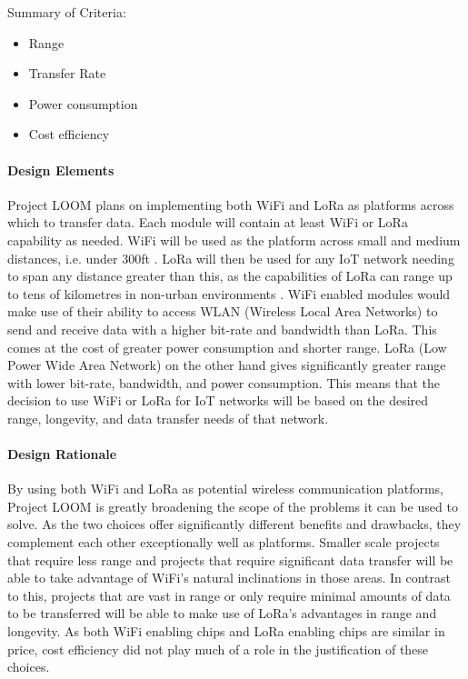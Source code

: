 \documentclass[onecolumn, draftclsnofoot,10pt, compsoc]{IEEEtran}
\begin{document}
    Summary of Criteria:
    \begin{itemize}[noitemsep,topsep=-10pt]
        \item Range
        \item Transfer Rate
        \item Power consumption
        \item Cost efficiency
    \end{itemize}

\paragraph{Design Elements}
    Project LOOM plans on implementing both WiFi and LoRa as platforms across which to transfer data. Each module will contain at least WiFi or LoRa capability as needed. WiFi will be used as the platform across small and medium distances, i.e. under 300ft \cite{WiFi}. LoRa will then be used for any IoT network needing to span any distance greater than this, as the capabilities of LoRa can range up to tens of kilometres in non-urban environments \cite{LoRa}. WiFi enabled modules would make use of their ability to access WLAN (Wireless Local Area Networks) to send and receive data with a higher bit-rate and bandwidth than LoRa. This comes at the cost of greater power consumption and shorter range. LoRa (Low Power Wide Area Network) on the other hand gives significantly greater range with lower bit-rate, bandwidth, and power consumption. This means that the decision to use WiFi or LoRa for IoT networks will be based on the desired range, longevity, and data transfer needs of that network.

\paragraph{Design Rationale}
    By using both WiFi and LoRa as potential wireless communication platforms, Project LOOM is greatly broadening the scope of the problems it can be used to solve. As the two choices offer significantly different benefits and drawbacks, they complement each other exceptionally well as platforms. Smaller scale projects that require less range and projects that require significant data transfer will be able to take advantage of WiFi's natural inclinations in those areas. In contrast to this, projects that are vast in range or only require minimal amounts of data to be transferred will be able to make use of LoRa's advantages in range and longevity. As both WiFi enabling chips and LoRa enabling chips are similar in price, cost efficiency did not play much of a role in the justification of these choices. 
\end{document}
